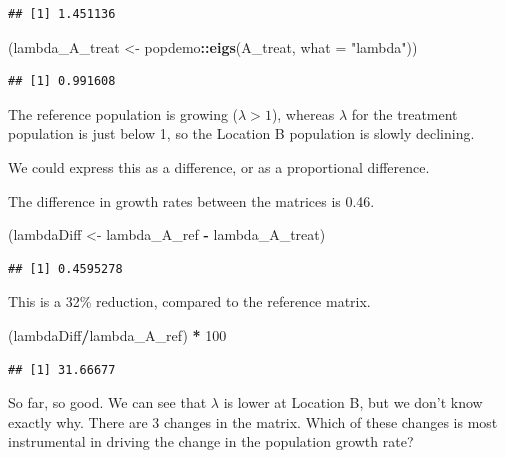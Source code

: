 \documentclass[
  a4paper]{book}
\newenvironment{Shaded}{\begin{snugshade}}{\end{snugshade}}
\newcommand{\AttributeTok}[1]{\textcolor[rgb]{0.13,0.29,0.53}{#1}}
\newcommand{\DecValTok}[1]{\textcolor[rgb]{0.00,0.00,0.81}{#1}}
\newcommand{\FunctionTok}[1]{\textcolor[rgb]{0.13,0.29,0.53}{\textbf{#1}}}
\newcommand{\NormalTok}[1]{#1}
\newcommand{\OtherTok}[1]{\textcolor[rgb]{0.56,0.35,0.01}{#1}}
\newcommand{\SpecialCharTok}[1]{\textcolor[rgb]{0.81,0.36,0.00}{\textbf{#1}}}
\newcommand{\StringTok}[1]{\textcolor[rgb]{0.31,0.60,0.02}{#1}}
\begin{document}
\begin{verbatim}
## [1] 1.451136
\end{verbatim}

\begin{Shaded}
\begin{Highlighting}[]
\NormalTok{(lambda\_A\_treat }\OtherTok{\textless{}{-}}\NormalTok{ popdemo}\SpecialCharTok{::}\FunctionTok{eigs}\NormalTok{(A\_treat, }\AttributeTok{what =} \StringTok{"lambda"}\NormalTok{))}
\end{Highlighting}
\end{Shaded}

\begin{verbatim}
## [1] 0.991608
\end{verbatim}

The reference population is growing (\(\lambda > 1\)), whereas \(\lambda\) for the treatment population is just below 1, so the Location B population is slowly declining.

We could express this as a difference, or as a proportional difference.

The difference in growth rates between the matrices is 0.46.

\begin{Shaded}
\begin{Highlighting}[]
\NormalTok{(lambdaDiff }\OtherTok{\textless{}{-}}\NormalTok{ lambda\_A\_ref }\SpecialCharTok{{-}}\NormalTok{ lambda\_A\_treat)}
\end{Highlighting}
\end{Shaded}

\begin{verbatim}
## [1] 0.4595278
\end{verbatim}

This is a 32\% reduction, compared to the reference matrix.

\begin{Shaded}
\begin{Highlighting}[]
\NormalTok{(lambdaDiff}\SpecialCharTok{/}\NormalTok{lambda\_A\_ref) }\SpecialCharTok{*} \DecValTok{100}
\end{Highlighting}
\end{Shaded}

\begin{verbatim}
## [1] 31.66677
\end{verbatim}

So far, so good. We can see that \(\lambda\) is lower at Location B, but we don't know exactly why. There are 3 changes in the matrix. Which of these changes is most instrumental in driving the change in the population growth rate?
\end{document}
